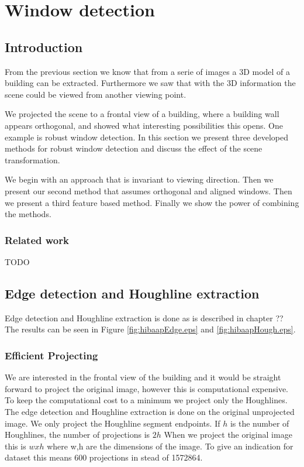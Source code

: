 \section{Window detection}
\label{chap:windowDetection}
\subsection{Introduction}
From the previous section we know that from a serie of images a 3D model of a
building can be extracted. Furthermore we saw that with the 3D information the
scene could be viewed from another viewing point. 

We projected the scene to a frontal view of a building, where a building wall appears
orthogonal, and showed what interesting possibilities this opens.
One example is robust window detection.
In this section we present three developed methods for robust window detection
and discuss the effect of the scene transformation.

We begin with an approach that is invariant to viewing direction.  Then we
present our second method that assumes orthogonal and aligned windows.  Then we
present a third feature based method.  Finally we show the power of combining
the methods.



\subsubsection{Related work}
TODO

\subsection{Edge detection and Houghline extraction} 
Edge detection and Houghline extraction is done as is described in chapter ??
The results can be seen in Figure \ref{fig:hibaapEdge.eps} and
\ref{fig:hibaapHough.eps}.
\subsubsection{Efficient Projecting} 
We are interested in the frontal view of the building and it would be straight
forward to project the original image, however this is computational
expensive. To keep the computational cost to a minimum we project only the
Houghlines. The edge detection and Houghline extraction is done on the original
unprojected image. We only project the Houghline segment
endpoints. If $h$ is the number of Houghlines, the number of projections is $2h$
When we project the original image this is $wxh$ where w,h are the dimensions of
the image. To give an indication for dataset %
this means 600 projections in stead of 1572864.


